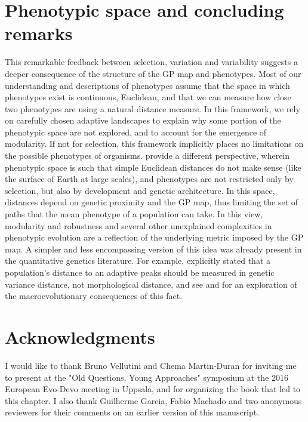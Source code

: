 \begin{refsection}
\section{Phenotypic space and concluding remarks}

This remarkable feedback between selection, variation and variability
suggests a deeper consequence of the structure of the GP map and
phenotypes. Most of our understanding and descriptions of phenotypes
assume that the space in which phenotypes exist is continuous,
Euclidean, and that we can measure how close two phenotypes are using a
natural distance measure. In this framework, we rely on carefully chosen
adaptive landscapes to explain why some portion of the phenotypic space
are not explored, and to account for the emergence of modularity. If not
for selection, this framework implicitly places no limitations on the
possible phenotypes of organisms. \textcite{Stadler2001-vt} provide a different
perspective, wherein phenotypic space is such that simple Euclidean
distances do not make sense (like the surface of Earth at large scales),
and phenotypes are not restricted only by selection, but also by
development and genetic architecture. In this space, distances depend on
genetic proximity and the GP map, thus limiting the set of paths that
the mean phenotype of a population can take. In this view, modularity
and robustness and several other unexplained complexities in phenotypic
evolution are a reflection of the underlying metric imposed by the GP
map. A simpler and less encompassing version of this idea was already
present in the quantitative genetics literature. For example,
\textcite{Lande1979-by} explicitly stated that a population's distance to an
adaptive peaks should be measured in genetic variance distance, not
morphological distance, and see \textcite{Steppan2002-be} and \textcite{Melo2016-yw} for an
exploration of the macroevolutionary consequences of this fact.

\section{Acknowledgments}

I would like to thank Bruno Vellutini and Chema Martin-Duran for inviting me to present at the "Old Questions, Young Approaches" symposium at the 2016 European Evo-Devo meeting in Uppsala, and for organizing the book that led to this chapter. I also thank Guilherme Garcia, Fabio Machado and two anonymous reviewers for their comments on an earlier version of this manuscript.

\printbibliography

\end{refsection}
